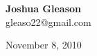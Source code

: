 \begin{titlepage}
\begin{center}



  \vspace*{0.2\textheight}

  { \large \bfseries Joshua Gleason}\\
  { \large gleaso22@gmail.com}\\

\vspace*{\fill}
  
\vspace*{\fill}

{\large November 8, 2010}

\end{center}

\end{titlepage}

